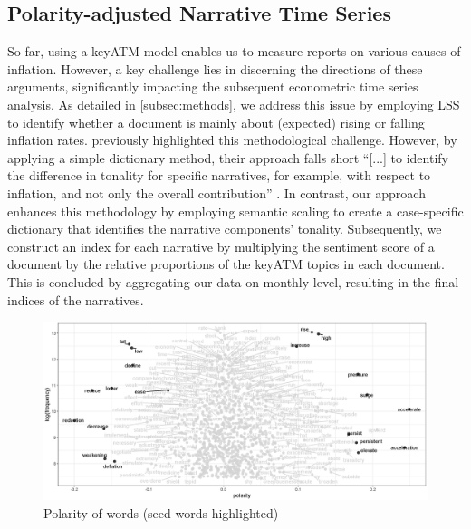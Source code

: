\subsection{Polarity-adjusted Narrative Time Series}
So far, using a \textsf{keyATM} model enables us to measure reports on various causes of inflation. However, a key challenge lies in discerning the directions of these arguments, significantly impacting the subsequent econometric time series analysis. As detailed in \ref{subsec:methods}, we address this issue by employing \textsf{LSS} to identify whether a document is mainly about (expected) rising or falling inflation rates. \cite{Ellen.2022} previously highlighted this methodological challenge. However, by applying a simple dictionary method, their approach falls short ``[...] to identify the difference in tonality for specific narratives, for example, with respect to inflation, and not only the overall contribution'' \citep[1533]{Ellen.2022}. In contrast, our approach enhances this methodology by employing semantic scaling to create a case-specific dictionary that identifies the narrative components’ tonality. Subsequently, we construct an index for each narrative by multiplying the sentiment score of a document by the relative proportions of the \textsf{keyATM} topics in each document. This is concluded by aggregating our data on monthly-level, resulting in the final indices of the narratives.

\begin{figure}[H]
	\includegraphics[width=1\textwidth]{figures/lss_words.eps}
	\caption{Polarity of words (seed words highlighted)}
	\label{fig:polarity}
\end{figure}

